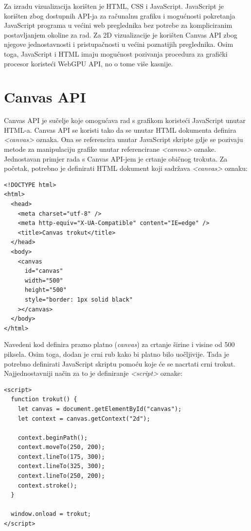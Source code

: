 \documentclass{foi}
\begin{document}
Za izradu vizualizacija korišten je HTML, CSS i JavaScript. JavaScript je korišten zbog dostupnih API-ja za računalnu grafiku i mogućnosti pokretanja JavaScript programa u većini web preglednika bez potrebe za kompliciranim postavljanjem okoline za rad. Za 2D vizualizacije je korišten Canvas API zbog njegove jednostavnosti i pristupačnosti u većini poznatijih preglednika. Osim toga, JavaScript i HTML imaju mogućnost pozivanja procedura za grafički procesor koristeći WebGPU API, no o tome više kasnije. 


\section{Canvas API}
Canvas API je sučelje koje omogućava rad s grafikom koristeći JavaScript unutar HTML-a. Canvas API se koristi tako da se unutar HTML dokumenta definira \textit{<canvas>} oznaka. Ona se referencira unutar JavaScript skripte gdje se pozivaju metode za manipulaciju grafike unutar referencirane \textit{<canvas>} oznake. Jednostavan primjer rada s Canvas API-jem je crtanje običnog trokuta. Za početak, potrebno je definirati HTML dokument koji sadržava \textit{<canvas>} oznaku:

\begin{verbatim}
<!DOCTYPE html>
<html>
  <head>
    <meta charset="utf-8" />
    <meta http-equiv="X-UA-Compatible" content="IE=edge" />
    <title>Canvas trokut</title>
  </head>
  <body>
    <canvas
      id="canvas"
      width="500"
      height="500"
      style="border: 1px solid black"
    ></canvas>
  </body>
</html>

\end{verbatim}
Navedeni kod definira prazno platno (\textit{canvas}) za crtanje širine i visine od 500 piksela. Osim toga, dodan je crni rub kako bi platno bilo uočljivije. Tada je potrebno definirati JavaScript skriptu pomoću koje će se nacrtati crni trokut. Najjednostavniji način za to je definiranje \textit{<script>} oznake:

\begin{verbatim}
<script>
  function trokut() {
    let canvas = document.getElementById("canvas");
    let context = canvas.getContext("2d");

    context.beginPath();
    context.moveTo(250, 200);
    context.lineTo(175, 300);
    context.lineTo(325, 300);
    context.lineTo(250, 200);
    context.stroke();
  }

  window.onload = trokut;
</script>

\end{verbatim}
\end{document}
